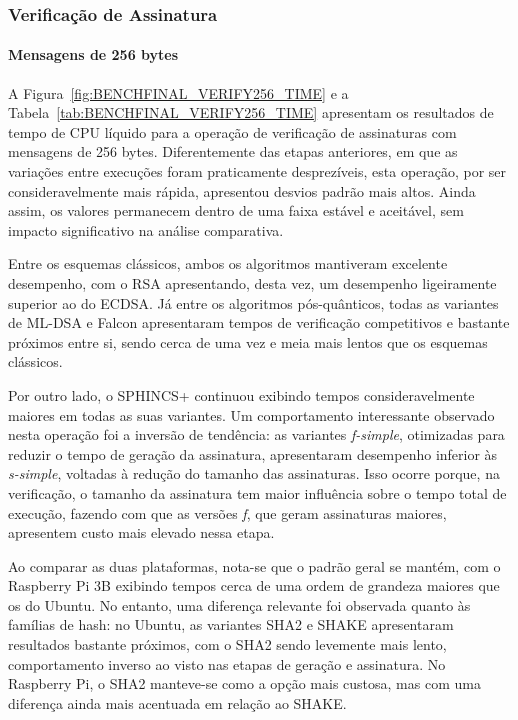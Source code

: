 


\subsubsection{Verificação de Assinatura}
\paragraph{Mensagens de 256 bytes}

A Figura~\ref{fig:BENCHFINAL_VERIFY256_TIME} e a Tabela~\ref{tab:BENCHFINAL_VERIFY256_TIME} apresentam os resultados de tempo de CPU líquido para a operação de verificação de assinaturas com mensagens de 256 bytes. Diferentemente das etapas anteriores, em que as variações entre execuções foram praticamente desprezíveis, esta operação, por ser consideravelmente mais rápida, apresentou desvios padrão mais altos. Ainda assim, os valores permanecem dentro de uma faixa estável e aceitável, sem impacto significativo na análise comparativa.

Entre os esquemas clássicos, ambos os algoritmos mantiveram excelente desempenho, com o RSA apresentando, desta vez, um desempenho ligeiramente superior ao do ECDSA. Já entre os algoritmos pós-quânticos, todas as variantes de ML-DSA e Falcon apresentaram tempos de verificação competitivos e bastante próximos entre si, sendo cerca de uma vez e meia mais lentos que os esquemas clássicos.

Por outro lado, o SPHINCS+ continuou exibindo tempos consideravelmente maiores em todas as suas variantes. Um comportamento interessante observado nesta operação foi a inversão de tendência: as variantes \textit{f-simple}, otimizadas para reduzir o tempo de geração da assinatura, apresentaram desempenho inferior às \textit{s-simple}, voltadas à redução do tamanho das assinaturas. Isso ocorre porque, na verificação, o tamanho da assinatura tem maior influência sobre o tempo total de execução, fazendo com que as versões \textit{f}, que geram assinaturas maiores, apresentem custo mais elevado nessa etapa.

Ao comparar as duas plataformas, nota-se que o padrão geral se mantém, com o Raspberry Pi 3B exibindo tempos cerca de uma ordem de grandeza maiores que os do Ubuntu. No entanto, uma diferença relevante foi observada quanto às famílias de hash: no Ubuntu, as variantes SHA2 e SHAKE apresentaram resultados bastante próximos, com o SHA2 sendo levemente mais lento, comportamento inverso ao visto nas etapas de geração e assinatura. No Raspberry Pi, o SHA2 manteve-se como a opção mais custosa, mas com uma diferença ainda mais acentuada em relação ao SHAKE. 


